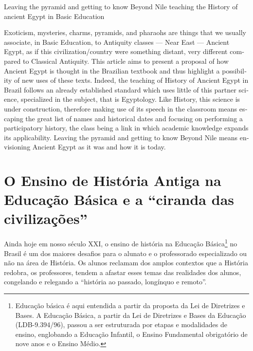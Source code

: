 \begin{refsection}
    
    \begin{otherlanguage}{english}
    
    \fakeChapterTwoLines
    {Leaving the pyramid and getting to know Beyond Nile}
    {teaching the History of ancient Egypt in Basic Education}

    \begin{galoResumo}[Abstract]
        Exoticism, mysteries, charms, pyramids, and pharaohs are things that we usually associate, in Basic Education, to Antiquity classes --- Near East --- Ancient Egypt, as if this civilization/country were something distant, very different compared to Classical Antiquity. This article aims to present a proposal of how Ancient Egypt is thought in the Brazilian textbook and thus highlight a possibility of new uses of these texts. Indeed, the teaching of History of Ancient Egypt in Brazil follows an already established standard which uses little of this partner science, specialized in the subject, that is Egyptology. Like History, this science is under construction, therefore making use of its speech in the classroom means escaping the great list of names and historical dates and focusing on performing a participatory history, the class being a link in which academic knowledge expands its applicability. Leaving the pyramid and getting to know Beyond Nile means envisioning Ancient Egypt as it was and how it is today.
    \end{galoResumo}
    
    \end{otherlanguage}

    \section{O Ensino de História Antiga na Educação Básica e a ``ciranda das civilizações''}

    Ainda hoje em nosso século XXI, o ensino de história na Educação Básica\footnote{Educação básica é aqui entendida a partir da proposta da Lei de Diretrizes e Bases. A Educação Básica, a partir da Lei de Diretrizes e Bases da Educação (LDB-9.394/96), passou a ser estruturada por etapas e modalidades de ensino, englobando a Educação Infantil, o Ensino Fundamental obrigatório de nove anos e o Ensino Médio.} no Brasil é um dos maiores desafios para o alunato e o professorado especializado ou não na área de História. Os alunos reclamam dos amplos contextos que a História redobra, os professores, tendem a afastar esses temas das realidades dos alunos, congelando e relegando a ``história ao passado, longínquo e remoto''.


\end{refsection}
